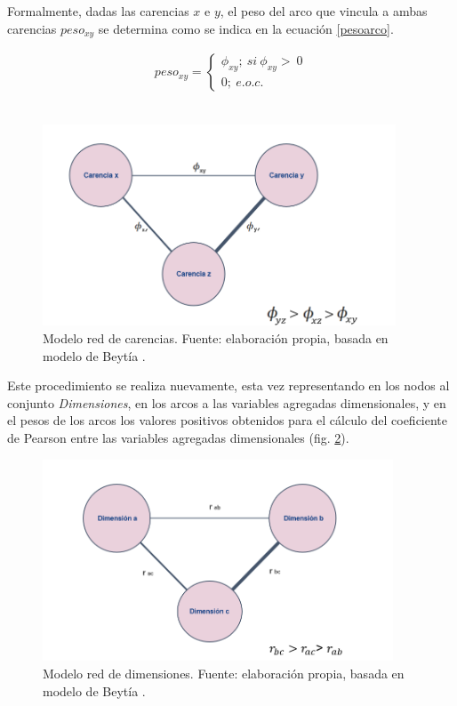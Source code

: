 \documentclass[12pt,letterpaper,spanish]{article}
\begin{document}
\begin{enumerate}
Formalmente, dadas las carencias $x$ e $y$, el peso del arco que vincula a ambas carencias $peso_{xy}$ se determina como se indica en la ecuación \ref{pesoarco}.

\begin{equation} \label{pesoarco}
\begin{split}
peso_{xy}= \begin{cases}
        \phi_{xy};\:si\:\phi_{xy}>\:0\\
        0;\:e.o.c.
        \end{cases}
\end{split}
\end{equation}\\




\begin{figure}[H]
    \centering
    \includegraphics[height=6cm]{Max/redes_phi.png}
    \caption{Modelo red de carencias. Fuente: elaboración propia, basada en modelo de Beytía \cite{Beytia2016PobrezaChile}.}
    \label{modelo_red_carencias}
\end{figure}

Este procedimiento se realiza nuevamente, esta vez representando en los nodos al conjunto \textit{Dimensiones}, en los arcos a las variables agregadas dimensionales, y en el pesos de los arcos los valores positivos obtenidos para el cálculo del coeficiente de Pearson entre las variables agregadas dimensionales (fig. \ref{modelo_red_dimensiones}).


\begin{figure}[H]
    \centering
    \includegraphics[height=6cm]{Max/redes_pearson.png}
    \caption{Modelo red de dimensiones. Fuente: elaboración propia, basada en modelo de Beytía \cite{Beytia2016PobrezaChile}.}
    \label{modelo_red_dimensiones}
\end{figure}


\end{enumerate}
\end{document}
